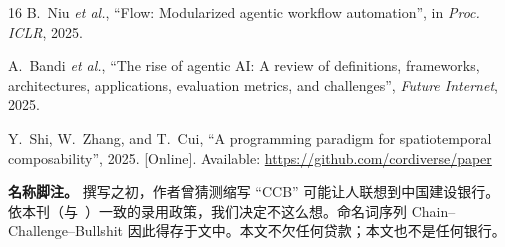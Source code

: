 \documentclass[journal]{IEEEtran}
\begin{document}
\begin{thebibliography}{16}
 B.~Niu \emph{et al.}, ``Flow: Modularized agentic workflow automation'', in \emph{Proc. ICLR}, 2025.

 A.~Bandi \emph{et al.}, ``The rise of agentic AI: A review of definitions, frameworks, architectures, applications, evaluation metrics, and challenges'', \textit{Future Internet}, 2025.

 Y.~Shi, W.~Zhang, and T.~Cui, ``A programming paradigm for spatiotemporal composability'', 2025. [Online]. Available: \url{https://github.com/cordiverse/paper}

\end{thebibliography}

\vspace{4pt}
\footnotesize
\textbf{名称脚注。} 撰写之初，作者曾猜测缩写 ``CCB'' 可能让人联想到中国建设银行。依本刊（与~\cite{pumera2020,sokal1996}）一致的录用政策，我们决定不这么想。命名词序列 Chain–Challenge–Bullshit 因此得存于文中。本文不欠任何贷款；本文也不是任何银行。
\end{document}

